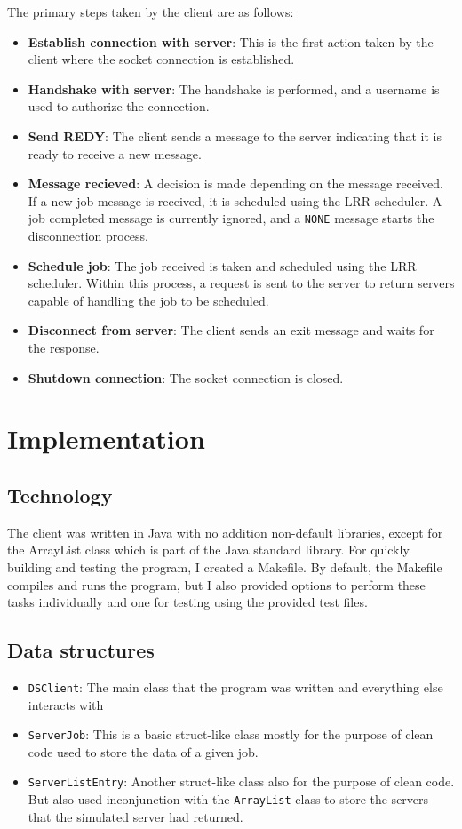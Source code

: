 \documentclass[a4paper]{article} %
\begin{document}
The primary steps taken by the client are as follows:
\begin{itemize}
	\item \textbf{Establish connection with server}: This is the first action taken by the client where the socket connection is established.
	\item\textbf{Handshake with server}: The handshake is performed, and a username is used to authorize the connection.
	\item\textbf{Send REDY}: The client sends a message to the server indicating that it is ready to receive a new message.
	\item\textbf{Message recieved}: A decision is made depending on the message received. If a new job message is received, it is scheduled using the LRR scheduler. A job completed message is currently ignored, and a \texttt{NONE} message starts the disconnection process.
	\item\textbf{Schedule job}: The job received is taken and scheduled using the LRR scheduler. Within this process, a request is sent to the server to return servers capable of handling the job to be scheduled.
	\item\textbf{Disconnect from server}: The client sends an exit message and waits for the response.
	\item\textbf{Shutdown connection}: The socket connection is closed.
\end{itemize}
\section{Implementation}

\subsection{Technology}
The client was written in Java with no addition non-default libraries, except for the ArrayList class which is part of the Java standard library.
For quickly building and testing the program, I created a Makefile. By default, the Makefile compiles and runs the program, but I also provided options to perform these tasks individually and one for testing using the provided test files.

\subsection{Data structures}
\begin{itemize}
	\item  \texttt{DSClient}: The main class that the program was written and everything else interacts with
	\item  \texttt{ServerJob}: This is a basic struct-like class mostly for the purpose of clean code used to store the data of a given job.
	\item  \texttt{ServerListEntry}: Another struct-like class also for the purpose of clean code. But also used inconjunction with the \texttt{ArrayList} class to store the servers that the simulated server had returned.
\end{itemize}
\end{document}
